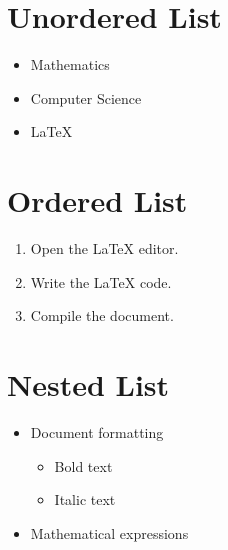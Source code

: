 \documentclass{article}
\begin{document}
\section{Unordered List}

\begin{itemize}
    \item Mathematics
    \item Computer Science
    \item LaTeX
\end{itemize}

\section{Ordered List}

\begin{enumerate}
    \item Open the LaTeX editor.
    \item Write the LaTeX code.
    \item Compile the document.
\end{enumerate}

\section{Nested List}

\begin{itemize}
    \item Document formatting
    \begin{itemize}
        \item Bold text
        \item Italic text
    \end{itemize}
    \item Mathematical expressions
\end{itemize}
\end{document}
